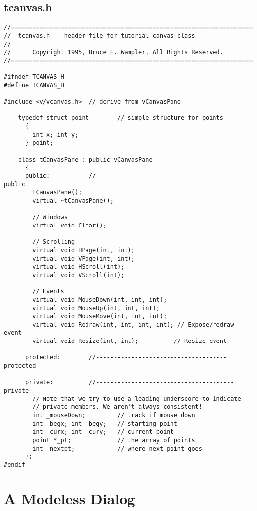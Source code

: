 \subsection*{tcanvas.h}
%
\footnotesize
\begin{verbatim}
//========================================================================
//  tcanvas.h -- header file for tutorial canvas class
//
//      Copyright 1995, Bruce E. Wampler, All Rights Reserved.
//========================================================================

#ifndef TCANVAS_H
#define TCANVAS_H

#include <v/vcanvas.h>  // derive from vCanvasPane

    typedef struct point        // simple structure for points
      {
        int x; int y;
      } point;

    class tCanvasPane : public vCanvasPane
      {
      public:           //---------------------------------------- public
        tCanvasPane();
        virtual ~tCanvasPane();

        // Windows
        virtual void Clear();

        // Scrolling
        virtual void HPage(int, int);
        virtual void VPage(int, int);
        virtual void HScroll(int);
        virtual void VScroll(int);

        // Events
        virtual void MouseDown(int, int, int);
        virtual void MouseUp(int, int, int);
        virtual void MouseMove(int, int, int);
        virtual void Redraw(int, int, int, int); // Expose/redraw event
        virtual void Resize(int, int);          // Resize event

      protected:        //------------------------------------- protected

      private:          //--------------------------------------- private
        // Note that we try to use a leading underscore to indicate
        // private members. We aren't always consistent!
        int _mouseDown;         // track if mouse down
        int _begx; int _begy;   // starting point
        int _curx; int _cury;   // current point
        point *_pt;             // the array of points
        int _nextpt;            // where next point goes
      };
#endif
\end{verbatim}
\normalfont\normalsize

\section{A Modeless Dialog}

